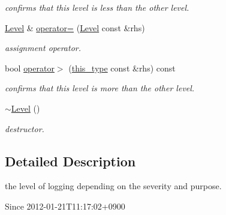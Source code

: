 \begin{DoxyCompactItemize}
\begin{DoxyCompactList}\small\item\em confirms that this level is less than the other level. \end{DoxyCompactList}\item 
\hypertarget{classhryky_1_1log_1_1_level_ad7e9458e5590f0dc233c3f74f3ef0fc8}{\hyperlink{classhryky_1_1log_1_1_level}{Level} \& \hyperlink{classhryky_1_1log_1_1_level_ad7e9458e5590f0dc233c3f74f3ef0fc8}{operator=} (\hyperlink{classhryky_1_1log_1_1_level}{Level} const \&rhs)}\label{classhryky_1_1log_1_1_level_ad7e9458e5590f0dc233c3f74f3ef0fc8}

\begin{DoxyCompactList}\small\item\em assignment operator. \end{DoxyCompactList}\item 
\hypertarget{classhryky_1_1log_1_1_level_a4c466927aa1adcbae2adb0c274bd3345}{bool \hyperlink{classhryky_1_1log_1_1_level_a4c466927aa1adcbae2adb0c274bd3345}{operator$>$} (\hyperlink{classhryky_1_1log_1_1_level_a2a7ccc2d552dfdf72dc1d543e18c4780}{this\-\_\-type} const \&rhs) const }\label{classhryky_1_1log_1_1_level_a4c466927aa1adcbae2adb0c274bd3345}

\begin{DoxyCompactList}\small\item\em confirms that this level is more than the other level. \end{DoxyCompactList}\item 
\hypertarget{classhryky_1_1log_1_1_level_a7384e672659038dc87f0963634dc68a0}{\hyperlink{classhryky_1_1log_1_1_level_a7384e672659038dc87f0963634dc68a0}{$\sim$\-Level} ()}\label{classhryky_1_1log_1_1_level_a7384e672659038dc87f0963634dc68a0}

\begin{DoxyCompactList}\small\item\em destructor. \end{DoxyCompactList}\end{DoxyCompactItemize}


\subsection{Detailed Description}
the level of logging depending on the severity and purpose. 

\begin{DoxySince}{Since}
2012-\/01-\/21\-T11\-:17\-:02+0900 
\end{DoxySince}


